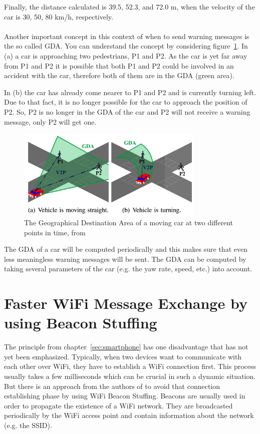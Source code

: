 \documentclass[]{ccs-thesis}
\begin{document}
Finally, the distance calculated is 39.5, 52.3, and 72.0 m, when the velocity of the car is 30, 50, 80 km/h, respectively. \cite{v2pcomm}
\\\\
Another important concept in this context of when to send warning messages is the so called \ac{GDA}. You can understand the concept by considering figure~\ref{fig:gda}. In (a) a car is approaching two pedestrians, P1 and P2. As the car is yet far away from P1 and P2 it is possible that both P1 and P2 could be involved in an accident with the car, therefore both of them are in the \ac{GDA} (green area).

In (b) the car has already come nearer to P1 and P2 and is currently turning left. Due to that fact, it is no longer possible for the car to approach the position of P2. So, P2 is no longer in the \ac{GDA} of the car and P2 will not receive a warning message, only P2 will get one.

\begin{figure}[h]
	\centering
	\includegraphics[width=0.8\textwidth]{figures/5_gda}
	\caption{The Geographical Destination Area of a moving car at two different points in time, from \cite{v2pcomm}}%
	\label{fig:gda}%
\end{figure}

The \ac{GDA} of a car will be computed periodically and this makes sure that even less meaningless warning messages will be sent. The \ac{GDA} can be computed by taking several parameters of the car (e.g. the yaw rate, speed, etc.) into account.

\section{Faster WiFi Message Exchange by using Beacon Stuffing}\label{sec:beacon}

The principle from chapter~\ref{sec:smartphone} has one disadvantage that has not yet been emphasized.
Typically, when two devices want to communicate with each other over WiFi, they have to establish a WiFi connection first. This process usually takes a few milliseconds which can be crucial in such a dynamic situation. But there is an approach from the authors of \cite{beacon} to avoid that connection establishing phase by using WiFi Beacon Stuffing. Beacons are usually used in order to propagate the existence of a WiFi network. They are broadcasted periodically by the WiFi access point and contain information about the network (e.g. the SSID).
\end{document}
